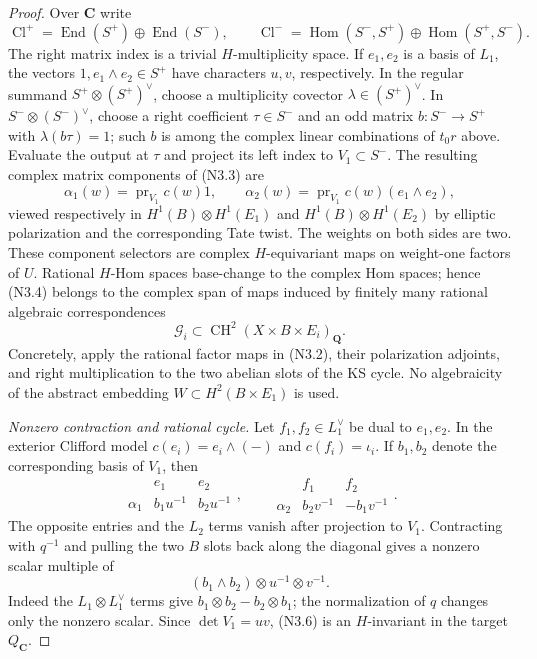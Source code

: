 \documentclass[10pt,reqno]{article}
\theoremstyle{emphasizedplain}
\theoremstyle{emphasizeddefinition}
\theoremstyle{emphasizeddefinition}
\DeclareMathOperator{\End}{End}
\DeclareMathOperator{\Hom}{Hom}
\DeclareMathOperator{\CH}{CH}
\newcommand{\Q}{\mathbf Q}
\newcommand{\C}{\mathbf C}
\begin{document}
\begin{proof}
Over $\C$ write
\[
 \operatorname{Cl}^+
   =\End(S^+)\oplus\End(S^-),\qquad
 \operatorname{Cl}^-
   =\Hom(S^-,S^+)\oplus\Hom(S^+,S^-).
\]
The right matrix index is a trivial $H$-multiplicity space. If
$e_1,e_2$ is a basis of $L_1$, the vectors $1,e_1\wedge e_2\in S^+$
have characters $u,v$, respectively. In the regular summand
$S^+\otimes(S^+)^\vee$, choose a multiplicity covector
$\lambda\in(S^+)^\vee$. In $S^-\otimes(S^-)^\vee$, choose a
right coefficient $\tau\in S^-$ and an odd matrix
$b:S^-\to S^+$ with $\lambda(b\tau)=1$; such $b$ is among the
complex linear combinations of $t_0r$ above. Evaluate the output
at $\tau$ and project its left index to $V_1\subset S^-$.
The resulting complex matrix components
of (N3.3) are
\[
 \alpha_1(w)=\operatorname{pr}_{V_1}c(w)1,
 \qquad
 \alpha_2(w)=\operatorname{pr}_{V_1}c(w)(e_1\wedge e_2),
                                                        \tag{N3.4}
\]
viewed respectively in
$H^1(B)\otimes H^1(E_1)$ and
$H^1(B)\otimes H^1(E_2)$ by elliptic polarization and the
corresponding Tate twist. The weights on both sides are two.
These component selectors are complex $H$-equivariant maps on
weight-one factors of $U$. Rational $H$-Hom spaces base-change to
the complex Hom spaces; hence (N3.4) belongs to the complex span of
maps induced by finitely many rational algebraic correspondences
\[
 \mathcal G_i\subset\CH^2(X\times B\times E_i)_\Q.
                                                        \tag{N3.5}
\]
Concretely, apply the rational factor maps in (N3.2), their
polarization adjoints, and right multiplication to the two abelian
slots of the KS cycle. No algebraicity of the abstract embedding
$W\subset H^2(B\times E_1)$ is used.

\emph{Nonzero contraction and rational cycle.}
Let $f_1,f_2\in L_1^\vee$ be dual to $e_1,e_2$. In the exterior
Clifford model $c(e_i)=e_i\wedge(-)$ and $c(f_i)=\iota_i$.
If $b_1,b_2$ denote the corresponding basis of $V_1$, then
\[
 \begin{array}{c|cc}&e_1&e_2\\\hline
 \alpha_1&b_1u^{-1}&b_2u^{-1}
 \end{array},\qquad
 \begin{array}{c|cc}&f_1&f_2\\\hline
 \alpha_2&b_2v^{-1}&-b_1v^{-1}
 \end{array}.
\]
The opposite entries and the $L_2$ terms vanish after projection
to $V_1$. Contracting with $q^{-1}$ and pulling the two $B$ slots
back along the diagonal gives a nonzero scalar multiple of
\[
        (b_1\wedge b_2)\otimes u^{-1}\otimes v^{-1}.
                                                        \tag{N3.6}
\]
Indeed the $L_1\otimes L_1^\vee$ terms give
$b_1\otimes b_2-b_2\otimes b_1$; the normalization of $q$ changes
only the nonzero scalar. Since $\det V_1=uv$, (N3.6) is an
$H$-invariant in the target $Q_\C$.


\end{proof}
\end{document}
